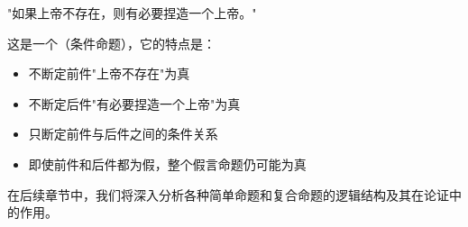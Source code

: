 \begin{examplebox}[title=假言命题]
"如果上帝不存在，则有必要捏造一个上帝。"\cite{voltaire1770}

这是一个（条件命题），它的特点是：
\begin{itemize}
  \item 不断定前件"上帝不存在"为真
  \item 不断定后件"有必要捏造一个上帝"为真
  \item 只断定前件与后件之间的条件关系
  \item 即使前件和后件都为假，整个假言命题仍可能为真
\end{itemize}
\end{examplebox}


在后续章节中，我们将深入分析各种简单命题和复合命题的逻辑结构及其在论证中的作用。